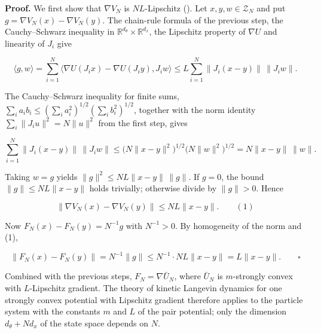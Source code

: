 \documentclass[11pt,a4paper]{article}
\begin{document}
\textbf{Proof.} We first show that \(\nabla V_N\) is \(NL\)-Lipschitz (\cite[Section~3.1.4]{LangevinLean2026IPLA}). Let \(x,y,w\in\mathcal Z_N\) and put \(g=\nabla V_N(x)-\nabla V_N(y)\). The chain-rule formula of the previous step, the Cauchy–Schwarz inequality in \(\mathbb R^{d_\theta}\times\mathbb R^{d_x}\), the Lipschitz property of \(\nabla U\) and linearity of \(J_i\) give


\[\langle g,w\rangle=\sum_{i=1}^N\bigl\langle\nabla U(J_ix)-\nabla U(J_iy),J_iw\bigr\rangle\le L\sum_{i=1}^N\|J_i(x-y)\|\,\|J_iw\|.\]


The Cauchy–Schwarz inequality for finite sums, \(\sum_ia_ib_i\le(\sum_ia_i^2)^{1/2}(\sum_ib_i^2)^{1/2}\), together with the norm identity \(\sum_i\|J_iu\|^2=N\|u\|^2\) from the first step, gives


\[\sum_{i=1}^N\|J_i(x-y)\|\,\|J_iw\|\le\bigl(N\|x-y\|^2\bigr)^{1/2}\bigl(N\|w\|^2\bigr)^{1/2}=N\|x-y\|\,\|w\|.\]


Taking \(w=g\) yields \(\|g\|^2\le NL\|x-y\|\,\|g\|\). If \(g=0\), the bound \(\|g\|\le NL\|x-y\|\) holds trivially; otherwise divide by \(\|g\|>0\). Hence


\[\|\nabla V_N(x)-\nabla V_N(y)\|\le NL\|x-y\|.\qquad(1)\]


Now \(F_N(x)-F_N(y)=N^{-1}g\) with \(N^{-1}>0\). By homogeneity of the norm and (1),


\[\|F_N(x)-F_N(y)\|=N^{-1}\|g\|\le N^{-1}\cdot NL\|x-y\|=L\|x-y\|.\qquad\square\]


Combined with the previous steps, \(F_N=\nabla\bar U_N\), where \(\bar U_N\) is \(m\)-strongly convex with \(L\)-Lipschitz gradient. The theory of kinetic Langevin dynamics for one strongly convex potential with Lipschitz gradient therefore applies to the particle system with the constants \(m\) and \(L\) of the pair potential; only the dimension \(d_\theta+Nd_x\) of the state space depends on \(N\).
\end{document}
